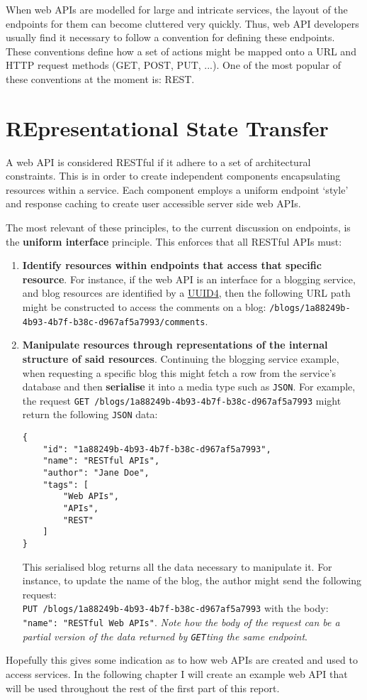 When web APIs are modelled for large and intricate services, the layout of the endpoints for them can become cluttered very quickly. Thus, web API developers usually find it necessary to follow a convention for defining these endpoints. These conventions define how a set of actions might be mapped onto a URL and HTTP request methods (GET, POST, PUT, ...). One of the most popular of these conventions at the moment is: REST.

\section{REpresentational State Transfer}

A web API is considered RESTful if it adhere to a set of architectural constraints\textsuperscript{\cite{richardson_ruby_2007}}. This is in order to create independent components encapsulating resources within a service. Each component employs a uniform endpoint `style' and response caching to create user accessible server side web APIs.

The most relevant of these principles, to the current discussion on endpoints, is the \textbf{uniform interface} principle. This enforces that all RESTful APIs must\textsuperscript{\cite{fielding_2000}}:


\begin{enumerate}
    \item \textbf{Identify resources within endpoints that access that specific resource}. For instance, if the web API is an interface for a blogging service, and blog resources are identified by a \href{https://www.uuidgenerator.net/version4}{UUID4}, then the following URL path might be constructed to access the comments on a blog: \verb|/blogs/1a88249b-4b93-4b7f-b38c-d967af5a7993/comments|.
    \item \textbf{Manipulate resources through representations of the internal structure of said resources}. Continuing the blogging service example, when requesting a specific blog this might fetch a row from the service's database and then \textbf{serialise} it into a media type such as \verb|JSON|. For example, the request \verb|GET /blogs/1a88249b-4b93-4b7f-b38c-d967af5a7993| might return the following \verb|JSON| data:
    \begin{verbatim}
{
    "id": "1a88249b-4b93-4b7f-b38c-d967af5a7993",
    "name": "RESTful APIs",
    "author": "Jane Doe",
    "tags": [
        "Web APIs",
        "APIs",
        "REST"
    ]
}    
    \end{verbatim}
    This serialised blog returns all the data necessary to manipulate it. For instance, to update the name of the blog, the author might send the following request: \\\verb|PUT /blogs/1a88249b-4b93-4b7f-b38c-d967af5a7993| with the body: \texttt{{"name": "RESTful Web APIs"}}. \cprotect\textit{Note how the body of the request can be a partial version of the data returned by \verb|GET|ting the same endpoint}.
\end{enumerate}

Hopefully this gives some indication as to how web APIs are created and used to access services. In the following chapter I will create an example web API that will be used throughout the rest of the first part of this report.
